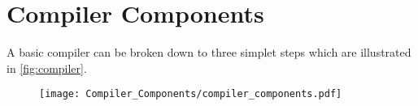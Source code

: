 \chapter{Compiler Components}

A basic compiler can be broken down to three simplet steps which are illustrated in \ref{fig:compiler}.

\begin{figure}
\texttt{[image: Compiler\_Components/compiler\_components.pdf]}
\label{compiler}
\end{figure}



